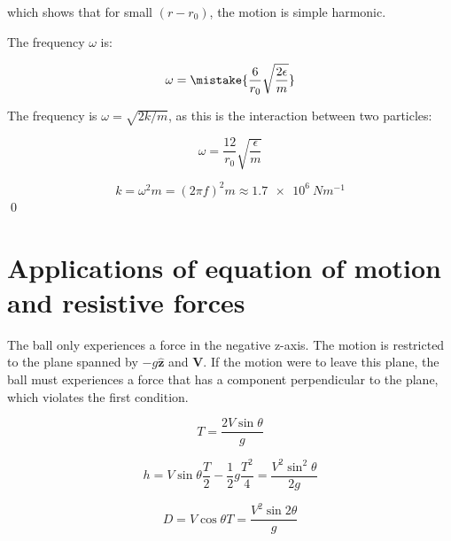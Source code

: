 \documentclass[12pt]{article}
\begin{document}
which shows that for small $(r - r_{0})$, the motion is simple harmonic.

The frequency $\omega$ is:

\begin{equation}
    \omega = \mistake{\frac{6}{r_{0}} \sqrt{\frac{2\epsilon}{m}}}
\end{equation}

\begin{correction}
    The frequency is $\omega = \sqrt{2k/m}$, as this is the interaction between two particles:

    \begin{equation}
        \omega = \frac{12}{r_{0}} \sqrt{\frac{\epsilon}{m}}
    \end{equation}
\end{correction}


\begin{equation}
    k = \omega^{2} m = \left( 2\pi f \right)^{2} m \approx \qty{1.7e6}{Nm^{-1}}
\end{equation}
\qed


\pagebreak
\section*{Applications of equation of motion and resistive forces}


The ball only experiences a force in the negative z-axis. The motion is restricted to the plane spanned by $-g \hat{\mathbf{z}}$ and $\mathbf{V}$. If the motion were to leave this plane, the ball must experiences a force that has a component perpendicular to the plane, which violates the first condition.


\begin{equation}
    T = \frac{2V\sin{\theta}}{g}
\end{equation}


\begin{equation}
    h = V \sin{\theta} \frac{T}{2} - \frac{1}{2} g \frac{T^{2}}{4} = \frac{V^{2} \sin^{2}{\theta}}{2g}
\end{equation}


\begin{equation}
    D = V \cos{\theta} T = \frac{V^{2}\sin{2\theta}}{g}
\end{equation}
\end{document}
